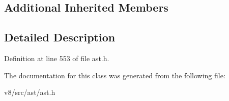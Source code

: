 \subsection*{Additional Inherited Members}


\subsection{Detailed Description}


Definition at line 553 of file ast.\+h.



The documentation for this class was generated from the following file\+:\begin{DoxyCompactItemize}
\item 
v8/src/ast/ast.\+h\end{DoxyCompactItemize}
